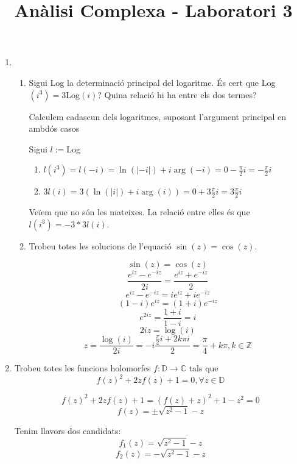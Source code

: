 \documentclass[10pt,a4paper]{article}
\author{ }
\title{Anàlisi Complexa - Laboratori 3}
\begin{document}
\maketitle

\begin{enumerate}
\item
	\begin{enumerate}
	\item Sigui Log la determinació principal del logaritme. És cert que Log$(i^{3})=3$Log$(i)$? Quina relació hi ha entre els dos termes?
	\begin{framed}
	Calculem cadascun dels logaritmes, suposant l'argument principal en ambdós casos
	
	Sigui $l:=$Log
	
	\begin{enumerate}
	 \item $l(i^{3}) = l(-i) = \ln(|-i|) + i\arg(-i) = 0-\frac{\pi}{2}i = -\frac{\pi}{2}i$
	 \item $3l(i) = 3(\ln(|i|)+i\arg(i)) = 0+3\frac{\pi}{2}i = 3\frac{\pi}{2}i$
	\end{enumerate}

	Veïem que no són les mateixes.	
	La relació entre elles és que $l(i^{3}) = -3*3l(i)$.
	
	\end{framed}
	\item Trobeu totes les solucions de l’equació $\sin(z)=\cos(z)$.

	\begin{framed}
	$$\sin(z) = \cos(z)$$
	$$\frac{e^{iz}-e^{-iz}}{2i} = \frac{e^{iz}+e^{-iz}}{2}$$
	$$e^{iz}-e^{-iz} = ie^{iz}+ie^{-iz}$$
	$$(1-i)e^{iz} = (1+i)e^{-iz}$$
	$$e^{2iz} = \frac{1+i}{1-i} = i$$
	$$2iz = \log(i)$$
	$$z = \frac{\log(i)}{2i} = -i\frac{\frac{\pi}{2}i+2k\pi i}{2} = \frac{\pi}{4} + k\pi, k\in\mathbb{Z}$$
	
	\end{framed}
		
	\end{enumerate}
\newpage
\item Trobeu totes les funcions holomorfes $f:\mathbb{D}\rightarrow \mathbb{C}$ tals que
	$$f(z)^{2}+2zf(z)+1=0,\forall z\in\mathbb{D}$$

	\begin{framed}	
	$$f(z)^{2}+2zf(z)+1=(f(z)+z)^{2}+1-z^{2}=0$$
	$$f(z)=\pm\sqrt{z^{2}-1}-z$$
	
	Tenim llavors dos candidats:
	$$f_{1}(z) = \sqrt{z^{2}-1}-z$$
	$$f_{2}(z) = -\sqrt{z^{2}-1}-z$$
	

\end{framed}
\end{enumerate}
\end{document}

